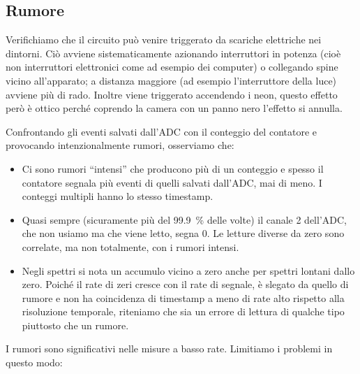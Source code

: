 \subsection{Rumore}

Verifichiamo che il circuito può venire triggerato da scariche elettriche nei dintorni.
Ciò avviene sistematicamente azionando interruttori in potenza
(cioè non interruttori elettronici come ad esempio dei computer)
o collegando spine vicino all'apparato;
a distanza maggiore (ad esempio l'interruttore della luce) avviene più di rado.
Inoltre viene triggerato accendendo i neon,
questo effetto però è ottico perché coprendo la camera con un panno nero l'effetto si annulla.

Confrontando gli eventi salvati dall'ADC con il conteggio del contatore
e provocando intenzionalmente rumori, osserviamo che:
\begin{itemize}
	\item
	Ci sono rumori ``intensi'' che producono più di un conteggio
	e spesso il contatore segnala più eventi di quelli salvati dall'ADC, mai di meno.
	I conteggi multipli hanno lo stesso timestamp.
	\item
	Quasi sempre (sicuramente più del \SI{99.9}{\percent} delle volte)
	il canale 2 dell'ADC, che non usiamo ma che viene letto, segna 0.
	Le letture diverse da zero sono correlate, ma non totalmente, con i rumori intensi.
	\item
	Negli spettri si nota un accumulo vicino a zero anche per spettri lontani dallo zero.
	Poiché il rate di zeri cresce con il rate di segnale, è slegato da quello di rumore
	e non ha coincidenza di timestamp a meno di rate alto rispetto alla risoluzione temporale,
	riteniamo che sia un errore di lettura di qualche tipo piuttosto che un rumore.
\end{itemize}
I rumori sono significativi nelle misure a basso rate.
Limitiamo i problemi in questo modo:
